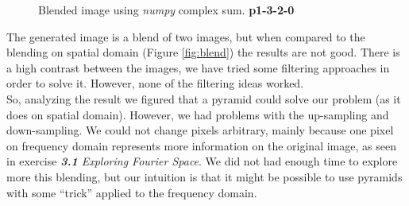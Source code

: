 \documentclass[12pt,a4paper]{article}
\begin{document}
\begin{figure}[!h]
	\centering
	{%
		\setlength{\fboxsep}{1pt}%
		\setlength{\fboxrule}{1pt}%
	}%
	\caption{Blended image using \emph{numpy} complex sum. \textbf{p1-3-2-0}}
	\label{fig:p1-3-2-0}
\end{figure}

The generated image is a blend of two images, but when compared to the blending on spatial domain (Figure \ref{fig:blend}) the results are not good. There is a high contrast between the images, we have tried some filtering approaches in order to solve it. However, none of the filtering ideas worked. \\

So, analyzing the result we figured that a pyramid could solve our problem (as it does on spatial domain). However, we had problems with the up-sampling and down-sampling. We could not change pixels arbitrary, mainly because one pixel on frequency domain represents more information on the original image, as seen in exercise \emph{\textbf{3.1} Exploring Fourier Space}. We did not had enough time to explore more this blending, but our intuition is that it might be possible to use pyramids with some ``trick'' applied to the frequency domain. 
\end{document}
